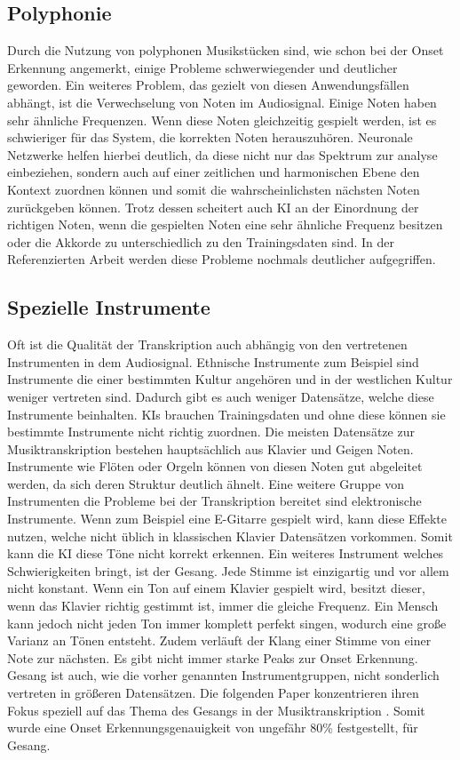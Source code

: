 \subsection{Polyphonie}
Durch die Nutzung von polyphonen Musikstücken sind, wie schon bei der Onset Erkennung angemerkt,
einige Probleme schwerwiegender und deutlicher geworden.
Ein weiteres Problem, das gezielt von diesen Anwendungsfällen abhängt, ist die Verwechselung von Noten im Audiosignal.
Einige Noten haben sehr ähnliche Frequenzen.
Wenn diese Noten gleichzeitig gespielt werden, ist es schwieriger für das System, die korrekten Noten herauszuhören.
Neuronale Netzwerke helfen hierbei deutlich, da diese nicht nur das Spektrum zur analyse einbeziehen,
sondern auch auf einer zeitlichen und harmonischen Ebene den Kontext zuordnen können
und somit die wahrscheinlichsten nächsten Noten zurückgeben können.
Trotz dessen scheitert auch KI an der Einordnung der richtigen Noten, wenn die gespielten Noten
eine sehr ähnliche Frequenz besitzen oder die Akkorde zu unterschiedlich zu den Trainingsdaten sind.
In der Referenzierten Arbeit  werden diese Probleme nochmals deutlicher aufgegriffen.

\subsection{Spezielle Instrumente}
Oft ist die Qualität der Transkription auch abhängig von den vertretenen Instrumenten in dem Audiosignal.
Ethnische Instrumente zum Beispiel sind Instrumente die einer bestimmten Kultur angehören
und in der westlichen Kultur weniger vertreten sind.
Dadurch gibt es auch weniger Datensätze, welche diese Instrumente beinhalten.
KIs brauchen Trainingsdaten und ohne diese können sie bestimmte Instrumente nicht richtig zuordnen.
Die meisten Datensätze zur Musiktranskription bestehen hauptsächlich aus Klavier und Geigen Noten.
Instrumente wie Flöten oder Orgeln können von diesen Noten gut abgeleitet werden,
da sich deren Struktur deutlich ähnelt.
Eine weitere Gruppe von Instrumenten die Probleme bei der Transkription bereitet sind elektronische Instrumente.
Wenn zum Beispiel eine E-Gitarre gespielt wird, kann diese Effekte nutzen,
welche nicht üblich in klassischen Klavier Datensätzen vorkommen.
Somit kann die KI diese Töne nicht korrekt erkennen.
Ein weiteres Instrument welches Schwierigkeiten bringt, ist der Gesang.
Jede Stimme ist einzigartig und vor allem nicht konstant.
Wenn ein Ton auf einem Klavier gespielt wird, besitzt dieser,
wenn das Klavier richtig gestimmt ist, immer die gleiche Frequenz.
Ein Mensch kann jedoch nicht jeden Ton immer komplett perfekt singen, wodurch eine große Varianz an Tönen entsteht.
Zudem verläuft der Klang einer Stimme von einer Note zur nächsten.
Es gibt nicht immer starke Peaks zur Onset Erkennung.
Gesang ist auch, wie die vorher genannten Instrumentgruppen, nicht sonderlich vertreten in größeren Datensätzen.
Die folgenden Paper konzentrieren ihren Fokus speziell auf das Thema des Gesangs in der Musiktranskription .
Somit wurde eine Onset Erkennungsgenauigkeit von ungefähr 80\% festgestellt, für Gesang.


